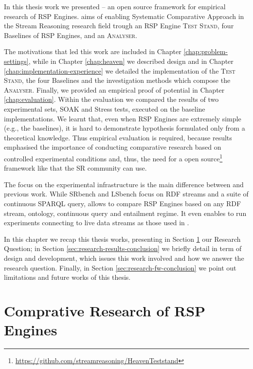 In this thesis work we presented \name -- an open source framework for empirical research of RSP Engines. \name aims of enabling Systematic Comparative Approach in the Stream Reasoning research field trough an RSP Engine \textsc{Test Stand}, four Baselines of RSP Engines, and an \textsc{Analyser}. 

The motivations that led this work are included in Chapter \ref{chap:problem-settings}, while in Chapter \ref{chap:heaven} we described \name design and in Chapter \ref{chap:implementation-experience} we detailed the implementation of the \textsc{Test Stand}, the four Baselines and the investigation methods which compose the \textsc{Analyser}. Finally, we provided an empirical proof of \name potential in Chapter \ref{chap:evaluation}. Within the evaluation we compared the results of two experimental sets, SOAK and Stress tests, executed on the baseline implementations. We learnt that, even when RSP Engines are extremely simple (e.g., the baselines), it is hard to demonstrate hypothesis formulated only from a theoretical knowledge. Thus empirical evaluation is required, because results emphasised the importance of conducting comparative research based on controlled experimental conditions and, thus, the need for a open source\footnote{\url{https://github.com/streamreasoning/HeavenTeststand}} framework like \name that the SR community can use.

The focus on the experimental infrastructure is the main difference between \name and previous work. While SRbench and LSbench focus on RDF streams and a suite of continuous SPARQL query, \name allows to compare RSP Engines based on any RDF stream, ontology, continuous query and entailment regime. It even enables to run experiments connecting to live data streams as those used in \cite{DBLP:conf/semweb/BalduiniVDTPC13}.	

In this chapter we recap this thesis works, presenting in Section \ref{sec:research-question-conclusion} our Research Question; in Section \ref{sec:research-results-conclusion} we briefly detail \namens in term of design and development, which issues this work involved and how we answer the research question. Finally, in Section \ref{sec:research-fw-conclusion} we point out \name limitations and future works of this thesis.

\section{Comprative Research of RSP Engines}\label{sec:research-question-conclusion}

